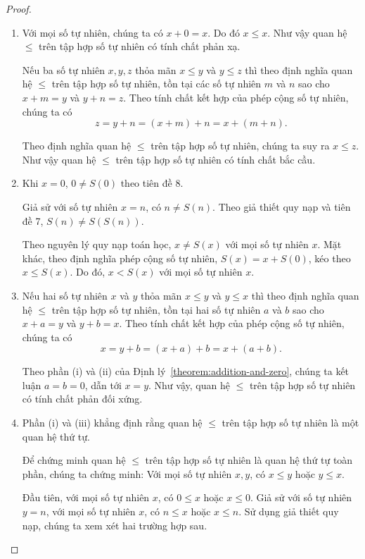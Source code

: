 \begin{proof}
    \begin{enumerate}[label={(\roman*)}]
        \item Với mọi số tự nhiên, chúng ta có $x + 0 = x$. Do đó $x\leq x$. Như vậy quan hệ $\leq$ trên tập hợp số tự nhiên có tính chất phản xạ.

              Nếu ba số tự nhiên $x, y, z$ thỏa mãn $x\leq y$ và $y\leq z$ thì theo định nghĩa quan hệ $\leq$ trên tập hợp số tự nhiên, tồn tại các số tự nhiên $m$ và $n$ sao cho $x + m = y$ và $y + n = z$. Theo tính chất kết hợp của phép cộng số tự nhiên, chúng ta có
              \[
                  z = y + n = (x + m) + n = x + (m + n).
              \]

              Theo định nghĩa quan hệ $\leq$ trên tập hợp số tự nhiên, chúng ta suy ra $x\leq z$. Như vậy quan hệ $\leq$ trên tập hợp số tự nhiên có tính chất bắc cầu.
        \item Khi $x = 0$, $0\ne S(0)$ theo tiên đề 8.

              Giả sử với số tự nhiên $x = n$, có $n\ne S(n)$. Theo giả thiết quy nạp và tiên đề 7, $S(n)\ne S(S(n))$.

              Theo nguyên lý quy nạp toán học, $x\ne S(x)$ với mọi số tự nhiên $x$. Mặt khác, theo định nghĩa phép cộng số tự nhiên, $S(x) = x + S(0)$, kéo theo $x\leq S(x)$. Do đó, $x < S(x)$ với mọi số tự nhiên $x$.
        \item Nếu hai số tự nhiên $x$ và $y$ thỏa mãn $x\leq y$ và $y\leq x$ thì theo định nghĩa quan hệ $\leq$ trên tập hợp số tự nhiên, tồn tại hai số tự nhiên $a$ và $b$ sao cho $x + a = y$ và $y + b = x$. Theo tính chất kết hợp của phép cộng số tự nhiên, chúng ta có
              \[
                  x = y + b = (x + a) + b = x + (a + b).
              \]

              Theo phần (i) và (ii) của Định lý~\ref{theorem:addition-and-zero}, chúng ta kết luận $a = b = 0$, dẫn tới $x = y$. Như vậy, quan hệ $\leq$ trên tập hợp số tự nhiên có tính chất phản đối xứng.
        \item Phần (i) và (iii) khẳng định rằng quan hệ $\leq$ trên tập hợp số tự nhiên là một quan hệ thứ tự.

              Để chứng minh quan hệ $\leq$ trên tập hợp số tự nhiên là quan hệ thứ tự toàn phần, chúng ta chứng minh: Với mọi số tự nhiên $x, y$, có $x\leq y$ hoặc $y\leq x$.

              Đầu tiên, với mọi số tự nhiên $x$, có $0\leq x$ hoặc $x\leq 0$. Giả sử với số tự nhiên $y = n$, với mọi số tự nhiên $x$, có $n\leq x$ hoặc $x\leq n$. Sử dụng giả thiết quy nạp, chúng ta xem xét hai trường hợp sau.


\end{enumerate}
\end{proof}
